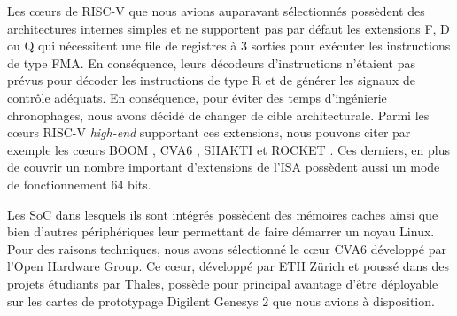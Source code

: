 \documentclass[../main.tex]{subfiles}
\begin{document}
Les cœurs de RISC-V que nous avions auparavant sélectionnés possèdent des architectures internes simples et ne supportent pas par défaut les extensions F, D ou Q qui nécessitent une file de registres à 3 sorties pour exécuter les instructions de type FMA.
En conséquence, leurs décodeurs d'instructions n'étaient pas prévus pour décoder les instructions de type R et de générer les signaux de contrôle adéquats. En conséquence, pour éviter des temps d'ingénierie chronophages, nous avons décidé de changer de cible architecturale.
Parmi les cœurs RISC-V \textit{high-end} supportant ces extensions, nous pouvons citer par exemple les cœurs BOOM \cite{boom}, CVA6 \cite{zaruba2019cost}, SHAKTI \cite{shakti} et ROCKET \cite{rocket}.
Ces derniers, en plus de couvrir un nombre important d'extensions de l'ISA possèdent aussi un mode de fonctionnement 64 bits.

Les SoC dans lesquels ils sont intégrés possèdent des mémoires caches ainsi que bien d'autres périphériques leur permettant de faire démarrer un noyau Linux.
Pour des raisons techniques, nous avons sélectionné le cœur CVA6 développé par l'Open Hardware Group. 
Ce cœur, développé par ETH Zürich et poussé dans des projets étudiants par Thales, possède pour principal avantage d'être déployable sur les cartes de prototypage Digilent Genesys 2 que nous avions à disposition.
\end{document}
